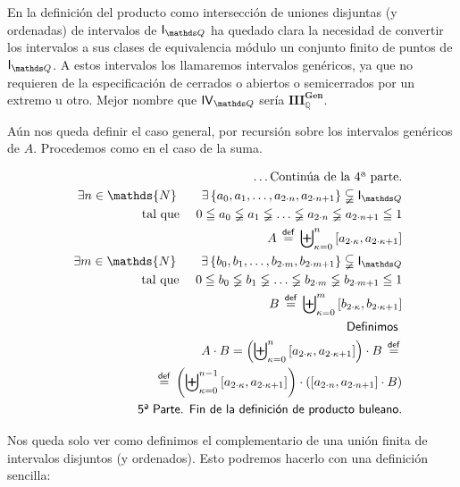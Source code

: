 \documentclass[final,12pt,a4paper,twoside,fleqn]{extbook}
\newcommand{\mathdef}{\ensuremath{\stackrel{\mathsf{def}}{{}={}}}}
\newcommand{\set}[1]{\ensuremath{\left\lbrace{#1}\right\rbrace}}
\newcommand{\setN}{\ensuremath{\mathds{N}}}
\newcommand{\setQ}{\ensuremath{\mathds{Q}}}
\theoremstyle{definition}
\theoremstyle{remark}
\begin{document}
	En la definición del producto como intersección de uniones disjuntas (y
ordenadas) de intervalos de \(\IQ\) ha quedado clara la necesidad de
convertir los intervalos a sus clases de equivalencia módulo un conjunto
finito de puntos de \(\IQ\). A estos intervalos los llamaremos intervalos
genéricos, ya que no requieren de la especificación de cerrados o abiertos o
semicerrados por un extremo u otro. Mejor nombre que \(\IVQ\) sería
\({\mathbf{III}}_{\setQ}^{\mathbf{Gen}}\).



Aún nos queda definir el caso general, por recursión sobre los intervalos
genéricos de \(A\). Procedemos como en el caso de la suma.



\begin{eqnarray} \nonumber
&&\ldots\text{Continúa de la 4ª parte.}\\
&&\exists n \in \setN \qquad
\exists \set{a_0,a_1,\ldots,a_{2\cdot n} , a_{{2 \cdot n} + 1}}
\subsetneqq \IQ \\
&&\text{       tal que  }\quad { 0 \leqq a_0 \lneqq a_1 \lneqq \ldots \lneqq
a_{2\cdot n} \lneqq a_{{2\cdot n} + 1} \leqq 1 }\\
&& A \mathdef {\biguplus}_{\kappa = 0}^{n} \left[a_{2\cdot\kappa},a_{{2\cdot
\kappa}+1}\right]\\
&&\exists m \in \setN \qquad
\exists \set{b_0,b_1,\ldots,b_{2\cdot m} , b_{{2 \cdot m} + 1}}
\subsetneqq \IQ \\
&&\text{       tal que  }\quad { 0 \leqq b_0 \lneqq b_1 \lneqq \ldots \lneqq
b_{2\cdot m} \lneqq b_{{2\cdot m} + 1} \leqq 1 }\\
&& B \mathdef {\biguplus}_{\kappa = 0}^{m} \left[b_{2\cdot\kappa},b_{{2\cdot
\kappa}+1}\right]\\ \nonumber
&& \textsf{		Definimos	}\\
&& A \cdot B = \left( { \biguplus }_{ \kappa = 0 }^{ n } \left[ a_{ 2 \cdot
\kappa } , a_{ { 2 \cdot \kappa } + 1 } \right] \right) \cdot B \mathdef \\
&&\qquad \mathdef \left( { \biguplus }_{ \kappa = 0 }^{ n-1 } \left[ a_{ 2
\cdot \kappa } , a_{ { 2 \cdot \kappa } + 1 } \right] \right) \cdot \left(
\left[ a_{ 2 \cdot n } , a_{ { 2 \cdot n } + 1 } \right] \cdot B \right) \\
\nonumber
&&\textsf{5ª Parte. Fin de la definición de producto buleano.}
\end{eqnarray}



	Nos queda solo ver como definimos el complementario de una unión finita
de intervalos disjuntos (y ordenados). Esto podremos hacerlo con una definición sencilla:
\end{document}
